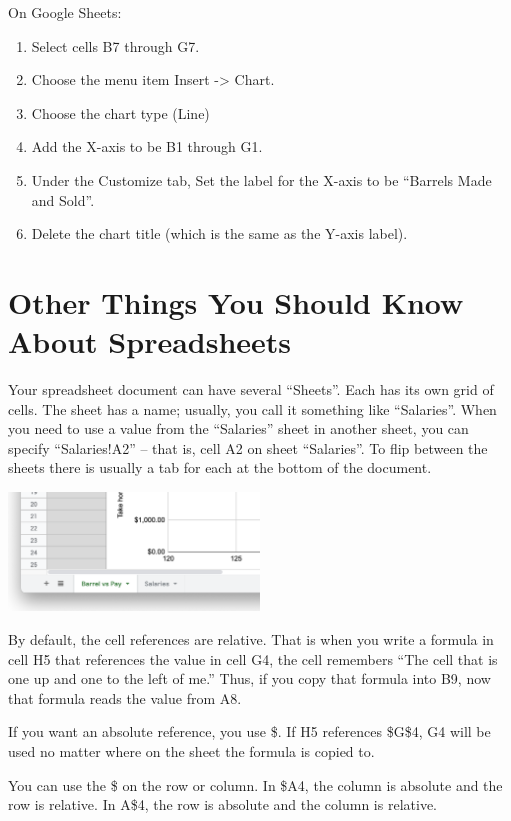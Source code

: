 On Google Sheets:

\begin{enumerate}
\item Select cells B7 through G7. 
\item Choose the menu item Insert -> Chart.
\item Choose the chart type (Line)
\item Add the X-axis to be B1 through G1.
\item Under the Customize tab, Set the label for the X-axis to be ``Barrels Made and Sold''.
\item Delete the chart title (which is the same as the Y-axis label).
\end{enumerate}

\section{Other Things You Should Know About Spreadsheets}

Your spreadsheet document can have several ``Sheets''.  Each has its
own grid of cells.  The sheet has a name; usually, you call it
something like ``Salaries''.  When you need to use a value from the
``Salaries'' sheet in another sheet, you can specify ``Salaries!A2''
-- that is, cell A2 on sheet ``Salaries''.  To flip between the sheets
there is usually a tab for each at the bottom of the document.

\includegraphics[width=0.5\textwidth]{Sheets.png}

By default, the cell references are relative.  That is when you write
a formula in cell H5 that references the value in cell G4, the cell
remembers ``The cell that is one up and one to the left of me.''
Thus, if you copy that formula into B9, now that formula reads the
value from A8.

If you want an absolute reference, you use \$.  If H5 references
\$G\$4, G4 will be used no matter where on the sheet the formula is
copied to.

You can use the \$ on the row or column.  In \$A4, the column is
absolute and the row is relative.  In A\$4, the row is absolute and
the column is relative.

